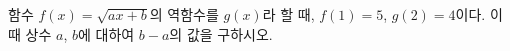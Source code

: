 \hspace*{2mm}\begin{minipage}[t]{\dimexpr\linewidth-2mm\relax}\vspace{0pt}
함수 $f(x)=\sqrt{ax+b}$의 역함수를 $g(x)$라 할 때, $f(1)=5$, $g(2)=4$이다. 이때 상수 $a$, $b$에 대하여 $b-a$의 값을 구하시오.\end{minipage}

